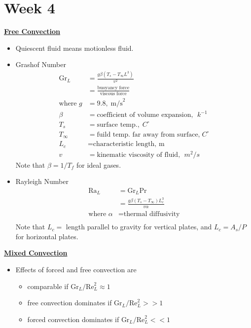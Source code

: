 \section{Week 4}
\underline{\Large \textbf{Free Convection}}


\begin{itemize}
    \item \color{blue} Quiescent fluid \color{black} means motionless fluid.
    \item \color{red}Grashof Number\color{black}
    \begin{align*}
        \text{Gr}_{L} &= \frac{g \beta (T_s- T_{\infty} L^3)}{v^2} \\ 
        &= \frac{\text{buoyancy force}}{\text{viscous force}} \\
        \text{where } g &= 9.8, \; \text{m/s}^2 \\
        \beta &= \text{coefficient of volume expansion, }\; k^{-1} \\
        T_s &= \text{surface temp.},\;C^{\circ} \\
        T_{\infty} &= \text{fuild temp. far away from surface,}\; C^{\circ}\\
        L_c &= \text{characteristic length, m}\\
        v &= \text{kinematic viscosity of fluid, }\;m^2/s
    \end{align*}
    Note that $\beta = 1/T_f$ for ideal gases.
    \item \color{red} Rayleigh Number\color{black}
    \begin{align*}
        \text{Ra}_L &= \text{Gr}_L \text{Pr}\\
        &= \frac{g\beta (T_s - T_{\infty})L_c^3}{v \alpha } \\
        \text{where } \alpha &= \text{thermal diffusivity} \\
    \end{align*}
    Note that $L_c = $ length parallel to gravity for vertical plates, and $L_c=A_s / P$ for horizontal plates. 
\end{itemize}
\underline{\textbf{Mixed Convection}}
\begin{itemize}
    \item Effects of \color{blue} forced \color{black} and \color{blue} free convection \color{black} are
    \begin{itemize}
        \item comparable if $\text{Gr}_L/\text{Re}_L^2 \approx 1$
        \item free convection dominates if $\text{Gr}_L/\text{Re}_L^2 >> 1$
        \item forced convection dominates if $\text{Gr}_L/\text{Re}_L^2 << 1$
    \end{itemize}
\end{itemize}

